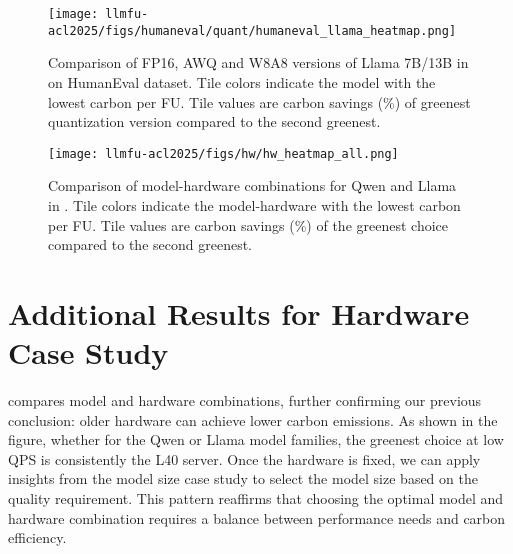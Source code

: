 \begin{figure}[!t]
    \centering
    \texttt{[image: llmfu-acl2025/figs/humaneval/quant/humaneval\_llama\_heatmap.png]}
    \vspace{-0.2in}
    \caption{Comparison of FP16, AWQ and W8A8 versions of Llama 7B/13B in \SYSTEM{} on HumanEval dataset. Tile colors indicate the model with the lowest carbon per FU. Tile values are carbon savings (\%) of greenest quantization version compared to the second greenest.}
    \label{fig:humaneval_quant_heat_w8a8_llama}
\end{figure}


\begin{figure}[!t]
    \centering
    \texttt{[image: llmfu-acl2025/figs/hw/hw\_heatmap\_all.png]}
    \caption{Comparison of model-hardware combinations for Qwen and Llama in \SYSTEM{}. Tile colors indicate the model-hardware with the lowest carbon per FU. Tile values are carbon savings (\%) of the greenest choice compared to the second greenest.}
    \label{fig:hw_heatmap_all}
\end{figure}

\section{Additional Results for Hardware Case Study}
\label{sec:appendix_hardware}
 compares model and hardware combinations, further confirming our previous conclusion: older hardware can achieve lower carbon emissions. As shown in the figure, whether for the Qwen or Llama model families, the greenest choice at low QPS is consistently the L40 server. Once the hardware is fixed, we can apply insights from the model size case study to select the model size based on the quality requirement. This pattern reaffirms that choosing the optimal model and hardware combination requires a balance between performance needs and carbon efficiency.





